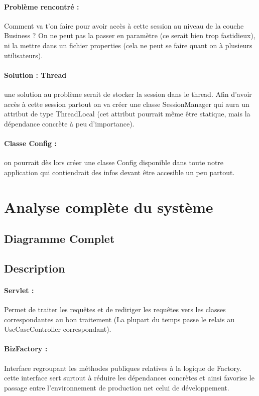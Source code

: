 \documentclass{article}[12pt]
\begin{document}
\paragraph{Problème rencontré : } Comment va t'on faire pour avoir accès à cette session au niveau de la couche Business ? On ne peut pas la passer en paramètre (ce serait bien trop fastidieux), ni la mettre dans un fichier properties (cela ne peut se faire quant on à plusieurs utilisateurs).
\paragraph{Solution : Thread} une solution au problème serait de stocker la session dans le thread. Afin d'avoir accès à cette session partout on va créer une classe SessionManager qui aura un attribut de type ThreadLocal (cet attribut pourrait même être statique, mais la dépendance concrète à peu d'importance). 
\paragraph{Classe Config : } on pourrait dès lors créer une classe Config disponible dans toute notre application qui contiendrait des infos devant être accesible un peu partout. 
\section{Analyse complète du système}
\subsection{Diagramme Complet}
\begin{landscape}
    \centering
\end{landscape}
\subsection{Description}
\paragraph{Servlet : } Permet de traiter les requêtes et de rediriger les requêtes vers les classes correspondantes au bon traitement (La plupart du temps passe le relais au UseCaseController correspondant).
\paragraph{BizFactory : } Interface regroupant les méthodes publiques relatives à la logique de Factory. cette interface sert surtout à réduire les dépendances concrètes et ainsi favorise le passage entre l’environnement de production net celui de développement. 
\end{document}
